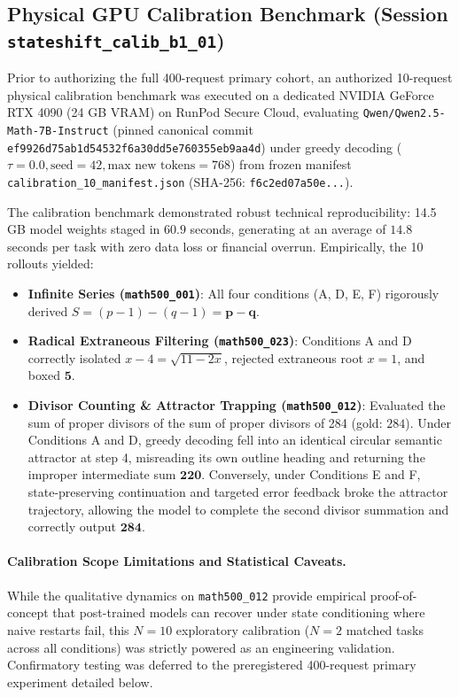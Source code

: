 \documentclass[11pt]{article}
\begin{document}
\subsection{Physical GPU Calibration Benchmark (Session \texttt{stateshift\_calib\_b1\_01})}
Prior to authorizing the full 400-request primary cohort, an authorized 10-request physical calibration benchmark was executed on a dedicated NVIDIA GeForce RTX 4090 (24 GB VRAM) on RunPod Secure Cloud, evaluating \texttt{Qwen/Qwen2.5-Math-7B-Instruct} (pinned canonical commit \texttt{ef9926d75ab1d54532f6a30dd5e760355eb9aa4d}) under greedy decoding ($\tau = 0.0, \text{seed} = 42, \text{max new tokens} = 768$) from frozen manifest \texttt{calibration\_10\_manifest.json} (SHA-256: \texttt{f6c2ed07a50e...}).

The calibration benchmark demonstrated robust technical reproducibility: 14.5 GB model weights staged in $60.9$ seconds, generating at an average of $14.8$ seconds per task with zero data loss or financial overrun. Empirically, the 10 rollouts yielded:
\begin{itemize}
    \item \textbf{Infinite Series (\texttt{math500\_001})}: All four conditions (A, D, E, F) rigorously derived $S = (p - 1) - (q - 1) = \mathbf{p - q}$.
    \item \textbf{Radical Extraneous Filtering (\texttt{math500\_023})}: Conditions A and D correctly isolated $x - 4 = \sqrt{11 - 2x}$, rejected extraneous root $x = 1$, and boxed $\mathbf{5}$.
    \item \textbf{Divisor Counting \& Attractor Trapping (\texttt{math500\_012})}: Evaluated the sum of proper divisors of the sum of proper divisors of 284 (gold: $284$). Under Conditions A and D, greedy decoding fell into an identical circular semantic attractor at step 4, misreading its own outline heading and returning the improper intermediate sum $\mathbf{220}$. Conversely, under Conditions E and F, state-preserving continuation and targeted error feedback broke the attractor trajectory, allowing the model to complete the second divisor summation and correctly output $\mathbf{284}$.
\end{itemize}

\paragraph{Calibration Scope Limitations and Statistical Caveats.}
While the qualitative dynamics on \texttt{math500\_012} provide empirical proof-of-concept that post-trained models can recover under state conditioning where naive restarts fail, this $N=10$ exploratory calibration ($N=2$ matched tasks across all conditions) was strictly powered as an engineering validation. Confirmatory testing was deferred to the preregistered 400-request primary experiment detailed below.
\end{document}
